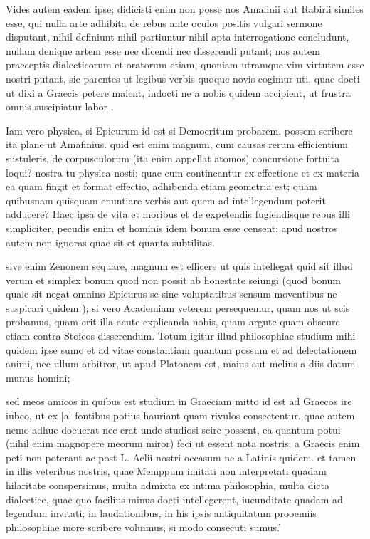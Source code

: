  Vides autem eadem ipse; didicisti enim non posse nos Amafinii aut Rabirii similes esse, qui nulla arte adhibita de rebus ante oculos positis vulgari sermone disputant, nihil definiunt nihil partiuntur nihil apta interrogatione concludunt, nullam denique artem esse nec dicendi nec disserendi putant; nos autem praeceptis dialecticorum et oratorum etiam, quoniam utramque vim virtutem esse nostri putant, sic parentes ut legibus verbis quoque novis cogimur uti, quae docti ut dixi a Graecis petere malent, indocti ne a nobis quidem accipient, ut frustra omnis suscipiatur labor .

 Iam vero physica, si Epicurum id est si Democritum probarem, possem scribere ita plane ut Amafinius. quid est enim magnum, cum causas rerum efficientium sustuleris, de corpusculorum (ita enim appellat atomos) concursione fortuita loqui? nostra tu physica nosti; quae cum contineantur ex effectione et ex materia ea quam fingit et format effectio, adhibenda etiam geometria est; quam quibusnam quisquam enuntiare verbis aut quem ad intellegendum poterit adducere? Haec ipsa de vita et moribus et de expetendis fugiendisque rebus illi simpliciter, pecudis enim et hominis idem bonum esse censent; apud nostros autem non ignoras quae sit et quanta subtilitas.

 sive enim Zenonem sequare, magnum est efficere ut quis intellegat quid sit illud verum et simplex bonum quod non possit ab honestate seiungi (quod bonum quale sit negat omnino Epicurus se sine voluptatibus sensum moventibus ne suspicari quidem ); si vero Academiam veterem persequemur, quam nos ut scis probamus, quam erit illa acute explicanda nobis, quam argute quam obscure etiam contra Stoicos disserendum. Totum igitur illud philosophiae studium mihi quidem ipse sumo et ad vitae constantiam quantum possum et ad delectationem animi, nec ullum arbitror, ut apud Platonem est, maius aut melius a diis datum munus homini;

 sed meos amicos in quibus est studium in Graeciam mitto id est ad Graecos ire iubeo, ut ex [a] fontibus potius hauriant quam rivulos consectentur. quae autem nemo adhuc docuerat nec erat unde studiosi scire possent, ea quantum potui (nihil enim magnopere meorum miror) feci ut essent nota nostris; a Graecis enim peti non poterant ac post L. Aelii nostri occasum ne a Latinis quidem. et tamen in illis veteribus nostris, quae Menippum imitati non interpretati quadam hilaritate conspersimus, multa admixta ex intima philosophia, multa dicta dialectice, quae quo facilius minus docti intellegerent, iucunditate quadam ad legendum invitati; in laudationibus, in his ipsis antiquitatum prooemiis philosophiae more scribere voluimus, si modo consecuti sumus.'

